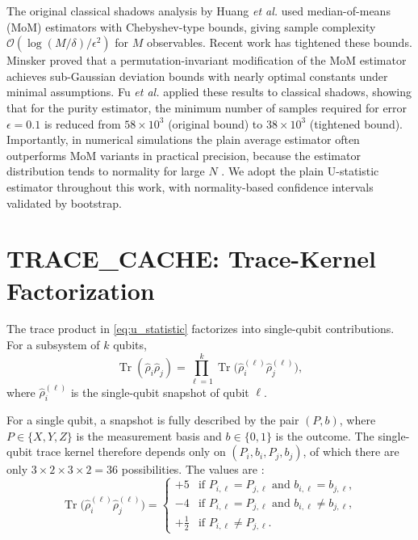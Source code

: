 \documentclass[12pt,a4paper,oneside]{book}
\theoremstyle{plain}
\theoremstyle{definition}
\theoremstyle{remark}
\begin{document}
The original classical shadows analysis by Huang \textit{et al.} \cite{huang2020predicting} used median-of-means (MoM) estimators with Chebyshev-type bounds, giving sample complexity $\mathcal{O}(\log(M/\delta)/\epsilon^2)$ for $M$ observables. Recent work has tightened these bounds. Minsker \cite{minsker2023efficient} proved that a permutation-invariant modification of the MoM estimator achieves sub-Gaussian deviation bounds with nearly optimal constants under minimal assumptions. Fu \textit{et al.} \cite{fu2025classical} applied these results to classical shadows, showing that for the purity estimator, the minimum number of samples required for error $\epsilon = 0.1$ is reduced from $58 \times 10^3$ (original bound) to $38 \times 10^3$ (tightened bound). Importantly, in numerical simulations the plain average estimator often outperforms MoM variants in practical precision, because the estimator distribution tends to normality for large $N$ \cite{fu2025classical}. We adopt the plain U-statistic estimator throughout this work, with normality-based confidence intervals validated by bootstrap.

\section{TRACE\_CACHE: Trace-Kernel Factorization}
\label{sec:trace_cache}

The trace product in \cref{eq:u_statistic} factorizes into single-qubit contributions. For a subsystem of $k$ qubits,
\begin{equation}
    \label{eq:trace_factorization}
    \operatorname{Tr}(\hat{\rho}_i \hat{\rho}_j) = \prod_{\ell=1}^{k} \operatorname{Tr}\bigl(\hat{\rho}_i^{(\ell)} \hat{\rho}_j^{(\ell)}\bigr),
\end{equation}
where $\hat{\rho}_i^{(\ell)}$ is the single-qubit snapshot of qubit $\ell$.

For a single qubit, a snapshot is fully described by the pair $(P, b)$, where $P \in \{X, Y, Z\}$ is the measurement basis and $b \in \{0,1\}$ is the outcome. The single-qubit trace kernel therefore depends only on $(P_i, b_i, P_j, b_j)$, of which there are only $3 \times 2 \times 3 \times 2 = 36$ possibilities. The values are \cite{elben2020cross}:
\begin{equation}
    \label{eq:trace_factors}
    \operatorname{Tr}\bigl(\hat{\rho}_i^{(\ell)} \hat{\rho}_j^{(\ell)}\bigr) =
    \begin{cases}
        +5 & \text{if } P_{i,\ell} = P_{j,\ell} \text{ and } b_{i,\ell} = b_{j,\ell}, \\
        -4 & \text{if } P_{i,\ell} = P_{j,\ell} \text{ and } b_{i,\ell} \neq b_{j,\ell}, \\
        +\tfrac12 & \text{if } P_{i,\ell} \neq P_{j,\ell}.
    \end{cases}
\end{equation}
\end{document}
